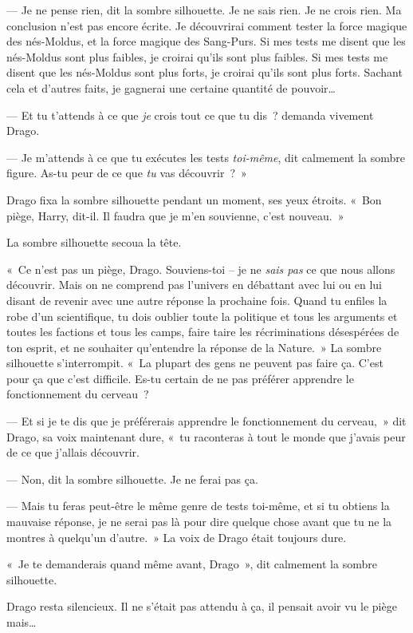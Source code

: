 --- Je ne pense rien, dit la sombre silhouette. Je ne sais rien. Je ne crois rien. Ma conclusion n'est pas encore écrite. Je découvrirai comment tester la force magique des nés-Moldus, et la force magique des Sang-Purs. Si mes tests me disent que les nés-Moldus sont plus faibles, je croirai qu'ils sont plus faibles. Si mes tests me disent que les nés-Moldus sont plus forts, je croirai qu'ils sont plus forts. Sachant cela et d'autres faits, je gagnerai une certaine quantité de pouvoir…

--- Et tu t'attends à ce que \emph{je} crois tout ce que tu dis~? demanda vivement Drago.

--- Je m'attends à ce que tu exécutes les tests \emph{toi-même}, dit calmement la sombre figure. As-tu peur de ce que \emph{tu} vas découvrir~?~»

Drago fixa la sombre silhouette pendant un moment, ses yeux étroits. «~Bon piège, Harry, dit-il. Il faudra que je m'en souvienne, c'est nouveau.~»

La sombre silhouette secoua la tête.

«~Ce n'est pas un piège, Drago. Souviens-toi -- je ne \emph{sais pas} ce que nous allons découvrir. Mais on ne comprend pas l'univers en débattant avec lui ou en lui disant de revenir avec une autre réponse la prochaine fois. Quand tu enfiles la robe d'un scientifique, tu dois oublier toute la politique et tous les arguments et toutes les factions et tous les camps, faire taire les récriminations désespérées de ton esprit, et ne souhaiter qu'entendre la réponse de la Nature.~» La sombre silhouette s'interrompit. «~La plupart des gens ne peuvent pas faire ça. C'est pour ça que c'est difficile. Es-tu certain de ne pas préférer apprendre le fonctionnement du cerveau~?

--- Et si je te dis que je préférerais apprendre le fonctionnement du cerveau,~» dit Drago, sa voix maintenant dure, «~tu raconteras à tout le monde que j'avais peur de ce que j'allais découvrir.

--- Non, dit la sombre silhouette. Je ne ferai pas ça.

--- Mais tu feras peut-être le même genre de tests toi-même, et si tu obtiens la mauvaise réponse, je ne serai pas là pour dire quelque chose avant que tu ne la montres à quelqu'un d'autre.~» La voix de Drago était toujours dure.

«~Je te demanderais quand même avant, Drago~», dit calmement la sombre silhouette.

Drago resta silencieux. Il ne s'était pas attendu à ça, il pensait avoir vu le piège mais…


